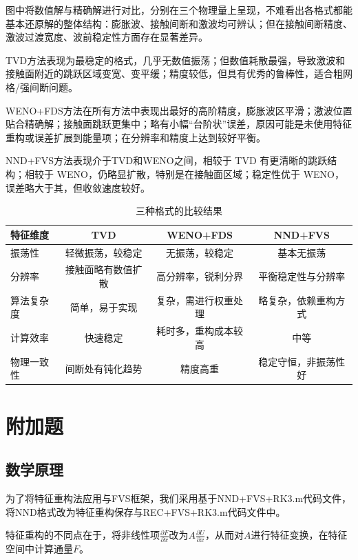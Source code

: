 \documentclass[12pt,a4paper]{article}%
\begin{document}
		图中将数值解与精确解进行对比，分别在三个物理量上呈现，不难看出各格式都能基本还原解的整体结构：膨胀波、接触间断和激波均可辨认；但在接触间断精度、激波过渡宽度、波前稳定性方面存在显著差异。
		
		TVD方法表现为最稳定的格式，几乎无数值振荡；但数值耗散最强，导致激波和接触面附近的跳跃区域变宽、变平缓；精度较低，但具有优秀的鲁棒性，适合粗网格/强间断问题。
		
		WENO+FDS方法在所有方法中表现出最好的高阶精度，膨胀波区平滑；激波位置贴合精确解；接触面跳跃更集中；略有小幅“台阶状”误差，原因可能是未使用特征重构或误差扩展到能量项；在分辨率和精度上达到较好平衡。
		
		NND+FVS方法表现介于TVD和WENO之间，相较于 TVD 有更清晰的跳跃结构；相较于 WENO，仍略显扩散，特别是在接触面区域；稳定性优于 WENO，误差略大于其，但收敛速度较好。
		
		\begin{table}[H]
			\centering
			\caption{三种格式的比较结果}
			\begin{tabular}{lccc}
				\toprule
				特征维度 & TVD & WENO+FDS & NND+FVS \\
				\midrule
				振荡性       & 轻微振荡，较稳定   & 无振荡，较稳定     & 基本无振荡 \\
				分辨率  & 接触面略有数值扩散     & 高分辨率，锐利分界   & 平衡稳定性与分辨率 \\
				算法复杂度   & 简单，易于实现   & 复杂，需进行权重处理     & 略复杂，依赖重构方式 \\
				计算效率 & 快速稳定 & 耗时多，重构成本较高 & 中等 \\
				物理一致性 & 间断处有钝化趋势 & 精度高重 & 稳定守恒，非振荡性好 \\
				\bottomrule
			\end{tabular}
		\end{table}
		
	\section{附加题}
	\subsection{数学原理}
		为了将特征重构法应用与FVS框架，我们采用基于NND+FVS+RK3.m代码文件，将NND格式改为特征重构保存与REC+FVS+RK3.m代码文件中。
		
		特征重构的不同点在于，将非线性项$\frac{\partial F}{\partial x}$改为$A\frac{\partial U}{\partial x}$，从而对$A$进行特征变换，在特征空间中计算通量$F$。
		
\end{document}
